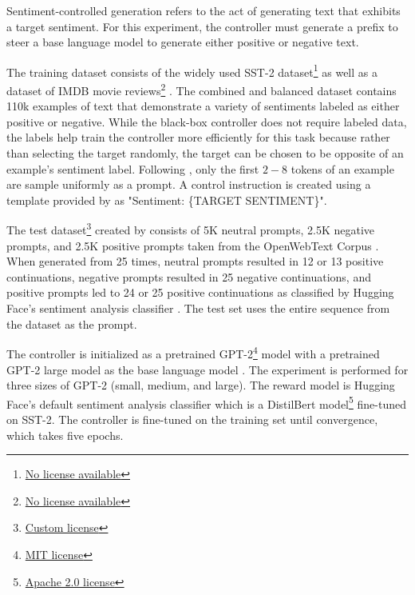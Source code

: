 \documentclass[phd,electronic,oneside,twosidetoc,letterpaper,chaptercenter,parttop,lof]{byumsphd}
\begin{document}
Sentiment-controlled generation refers to the act of generating text that exhibits a target sentiment.
For this experiment, the controller must generate a prefix to steer a base language model to generate either positive or negative text.

The training dataset consists of the widely used SST-2 dataset\footnote{\href{https://huggingface.co/datasets/stanfordnlp/sst2}{No license available}} \cite{socher2013sst5} as well as a dataset of IMDB movie reviews\footnote{\href{https://huggingface.co/datasets/stanfordnlp/imdb}{No license available}} \cite{maas2011imdb}.
The combined and balanced dataset contains 110k examples of text that demonstrate a variety of sentiments labeled as either positive or negative.
While the black-box controller does not require labeled data, the labels help train the controller more efficiently for this task because rather than selecting the target randomly, the target can be chosen to be opposite of an example's sentiment label.
Following \citet{vonwerra2022trl}, only the first $2-8$ tokens of an example are sample uniformly as a prompt. A control instruction is created using a template provided by \citet{zhang2023rmt} as \break "Sentiment: \{TARGET SENTIMENT\}".

The test dataset\footnote{\href{https://skylion007.github.io/OpenWebTextCorpus/}{Custom license}} created by \citet{liu2021dexpert} consists of 5K neutral prompts, 2.5K negative prompts, and 2.5K positive prompts taken from the OpenWebText Corpus \cite{Gokaslan2019OpenWeb}. 
When generated from 25 times, neutral prompts resulted in 12 or 13 positive continuations, negative prompts resulted in 25 negative continuations, and positive prompts led to 24 or 25 positive continuations as classified by Hugging Face's sentiment analysis classifier \cite{wolf2020huggingface}.
The test set uses the entire sequence from the dataset as the prompt.

The controller is initialized as a pretrained GPT-2\footnote{\href{https://huggingface.co/openai-community/gpt2}{MIT license}} model with a pretrained GPT-2 large model as the base language model \citep{radford2019gpt2}.
The experiment is performed for three sizes of GPT-2 (small, medium, and large).
The reward model is Hugging Face's default sentiment analysis classifier which is a DistilBert model\footnote{\href{https://huggingface.co/distilbert/distilbert-base-uncased-finetuned-sst-2-english}{Apache 2.0 license}} \cite{sanh2019distilbert} fine-tuned on SST-2.
The controller is fine-tuned on the training set until convergence, which takes five epochs.
\end{document}
